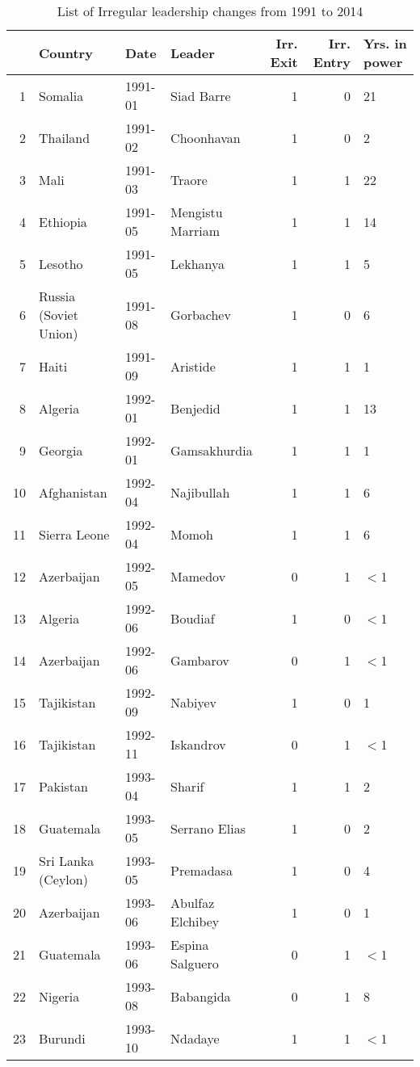 \documentclass[pdftex,11pt]{article}
\begin{document}
\begin{table*}[ht]
\centering \small
\caption{List of Irregular leadership changes from 1991 to 2014}
\label{tab:ilcs}
\begin{tabular}{rlllrrl}
 \toprule
 & Country & Date & Leader & Irr. Exit & Irr. Entry & Yrs. in power \\ 
  \midrule
1 & Somalia & 1991-01 & Siad Barre & 1 & 0 & 21 \\ 
  2 & Thailand & 1991-02 & Choonhavan & 1 & 0 & 2 \\ 
  3 & Mali & 1991-03 & Traore & 1 & 1 & 22 \\ 
  4 & Ethiopia & 1991-05 & Mengistu Marriam & 1 & 1 & 14 \\ 
  5 & Lesotho & 1991-05 & Lekhanya & 1 & 1 & 5 \\ 
  6 & Russia (Soviet Union) & 1991-08 & Gorbachev & 1 & 0 & 6 \\ 
  7 & Haiti & 1991-09 & Aristide & 1 & 1 & 1 \\ 
  8 & Algeria & 1992-01 & Benjedid & 1 & 1 & 13 \\ 
  9 & Georgia & 1992-01 & Gamsakhurdia & 1 & 1 & 1 \\ 
  10 & Afghanistan & 1992-04 & Najibullah & 1 & 1 & 6 \\ 
  11 & Sierra Leone & 1992-04 & Momoh & 1 & 1 & 6 \\ 
  12 & Azerbaijan & 1992-05 & Mamedov & 0 & 1 & $<$1 \\ 
  13 & Algeria & 1992-06 & Boudiaf & 1 & 0 & $<$1 \\ 
  14 & Azerbaijan & 1992-06 & Gambarov & 0 & 1 & $<$1 \\ 
  15 & Tajikistan & 1992-09 & Nabiyev & 1 & 0 & 1 \\ 
  16 & Tajikistan & 1992-11 & Iskandrov & 0 & 1 & $<$1 \\ 
  17 & Pakistan & 1993-04 & Sharif & 1 & 1 & 2 \\ 
  18 & Guatemala & 1993-05 & Serrano Elias & 1 & 0 & 2 \\ 
  19 & Sri Lanka (Ceylon) & 1993-05 & Premadasa & 1 & 0 & 4 \\ 
  20 & Azerbaijan & 1993-06 & Abulfaz Elchibey & 1 & 0 & 1 \\ 
  21 & Guatemala & 1993-06 & Espina Salguero & 0 & 1 & $<$1 \\ 
  22 & Nigeria & 1993-08 & Babangida & 0 & 1 & 8 \\ 
  23 & Burundi & 1993-10 & Ndadaye & 1 & 1 & $<$1 \\ 

\end{tabular}
\end{table*}
\end{document}
